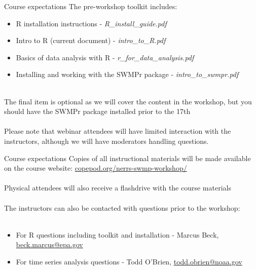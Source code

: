\documentclass[xcolor=svgnames]{beamer}\usepackage[]{graphicx}\usepackage[]{color}
\begin{document}
\begin{frame}{Course expectations}
The pre-workshop toolkit includes:
\begin{itemize}
\item R installation instructions - \textit{R\_install\_guide.pdf}
\item Intro to R (current document) - \textit{intro\_to\_R.pdf}
\item Basics of data analysis with R - \textit{r\_for\_data\_analysis.pdf}
\item Installing and working with the SWMPr package - \textit{intro\_to\_swmpr.pdf}\\~\\
\end{itemize}
The final item is optional as we will cover the content in the workshop, but you should have the SWMPr package installed prior to the 17th\\~\\
Please note that webinar attendees will have limited interaction with the instructors, although we will have moderators handling questions.
\end{frame}

\begin{frame}{Course expectations}
Copies of all instructional materials will be made available on the course website: \href{http://copepod.org/nerrs-swmp-workshop/}{copepod.org/nerrs-swmp-workshop/}\\~\\
Physical attendees will also receive a flashdrive with the course materials \\~\\
The instructors can also be contacted with questions prior to the workshop:\\~\\
\begin{itemize}
\item For R questions including toolkit and installation - Marcus Beck, \href{mailto:beck.marcus@epa.gov}{beck.marcus@epa.gov}
\item For time series analysis questions - Todd O'Brien, \href{mailto:todd.obrien@noaa.gov}{todd.obrien@noaa.gov}
\end{itemize}
\end{frame}
\end{document}

